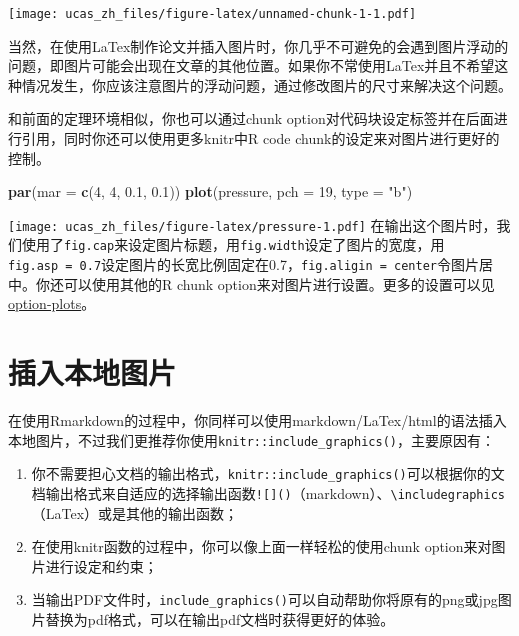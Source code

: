 \documentclass[singlesided]{Style/ucasthesis}%
\newcommand{\tightlist}{%
  \setlength{\itemsep}{0pt}\setlength{\parskip}{0pt}}
\newenvironment{Shaded}{\begin{snugshade}}{\end{snugshade}}
\newcommand{\KeywordTok}[1]{\textcolor[rgb]{0.13,0.29,0.53}{\textbf{{#1}}}}
\newcommand{\DataTypeTok}[1]{\textcolor[rgb]{0.13,0.29,0.53}{{#1}}}
\newcommand{\DecValTok}[1]{\textcolor[rgb]{0.00,0.00,0.81}{{#1}}}
\newcommand{\FloatTok}[1]{\textcolor[rgb]{0.00,0.00,0.81}{{#1}}}
\newcommand{\StringTok}[1]{\textcolor[rgb]{0.31,0.60,0.02}{{#1}}}
\newcommand{\NormalTok}[1]{{#1}}
\begin{document}
\texttt{[image: ucas\_zh\_files/figure-latex/unnamed-chunk-1-1.pdf]}

当然，在使用LaTex制作论文并插入图片时，你几乎不可避免的会遇到图片浮动的问题，即图片可能会出现在文章的其他位置。如果你不常使用LaTex并且不希望这种情况发生，你应该注意图片的浮动问题，通过修改图片的尺寸来解决这个问题。

和前面的定理环境相似，你也可以通过chunk option对代码块设定标签并在后面进行引用，同时你还可以使用更多knitr中R code chunk的设定来对图片进行更好的控制。

\begin{Shaded}
\begin{Highlighting}[]
\KeywordTok{par}\NormalTok{(}\DataTypeTok{mar =} \KeywordTok{c}\NormalTok{(}\DecValTok{4}\NormalTok{, }\DecValTok{4}\NormalTok{, }\FloatTok{0.1}\NormalTok{, }\FloatTok{0.1}\NormalTok{))}
\KeywordTok{plot}\NormalTok{(pressure, }\DataTypeTok{pch =} \DecValTok{19}\NormalTok{, }\DataTypeTok{type =} \StringTok{"b"}\NormalTok{)}
\end{Highlighting}
\end{Shaded}

\texttt{[image: ucas\_zh\_files/figure-latex/pressure-1.pdf]}
在输出这个图片时，我们使用了\texttt{fig.cap}来设定图片标题，用\texttt{fig.width}设定了图片的宽度，用\texttt{fig.asp\ =\ 0.7}设定图片的长宽比例固定在0.7，\texttt{fig.aligin\ =\ \textquotesingle{}center\textquotesingle{}}令图片居中。你还可以使用其他的R chunk option来对图片进行设置。更多的设置可以见\href{https://yihui.name/knitr/options/\#plots}{option-plots}。

\hypertarget{section-4}{%
\section{插入本地图片}\label{section-4}}

在使用Rmarkdown的过程中，你同样可以使用markdown/LaTex/html的语法插入本地图片，不过我们更推荐你使用\texttt{knitr::include\_graphics()}，主要原因有：

\begin{enumerate}
\def\labelenumi{\arabic{enumi}.}
\tightlist
\item
  你不需要担心文档的输出格式，\texttt{knitr::include\_graphics()}可以根据你的文档输出格式来自适应的选择输出函数\texttt{!{[}{]}()}（markdown）、\texttt{\textbackslash{}includegraphics}（LaTex）或是其他的输出函数；
\item
  在使用knitr函数的过程中，你可以像上面一样轻松的使用chunk option来对图片进行设定和约束；
\item
  当输出PDF文件时，\texttt{include\_graphics()}可以自动帮助你将原有的png或jpg图片替换为pdf格式，可以在输出pdf文档时获得更好的体验。
\end{enumerate}
\end{document}

